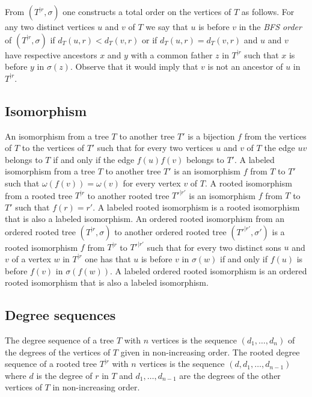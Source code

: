 \documentclass[11 pt]{modarticle}
\newcommand{\wmap}{\omega}
\newcommand{\distance}[3]{d_{#3}(#1,#2)}
\newcommand{\rtree}[2]{{#1}^{\lvert #2}}
\newcommand{\ortree}[3]{(\rtree{#1}{#2},{#3})}
\begin{document}
From $\ortree{T}{r}{\sigma}$ one constructs a total order on the vertices of $T$ as follows. For any two distinct vertices $u$ and $v$ of $T$ we say that $u$ is before $v$ in the \textit{BFS order} of $\ortree{T}{r}{\sigma}$ if $\distance{u}{r}{T} < \distance{v}{r}{T}$ or if $\distance{u}{r}{T} = \distance{v}{r}{T}$ and $u$ and $v$ have respective ancestors $x$ and $y$ with a common father $z$ in $\rtree{T}{r}$ such that $x$ is before $y$ in $\sigma(z)$. Observe that it would imply that $v$ is not an ancestor of $u$ in $\rtree{T}{r}$.


\subsection{Isomorphism}

An isomorphism from a tree $T$ to another tree $T'$ is a bijection $f$ from the vertices of $T$ to the vertices of $T'$ such that for every two vertices $u$ and $v$ of $T$ the edge $uv$ belongs to $T$ if and only if the edge $f(u)f(v)$ belongs to $T'$. A labeled isomorphism from a tree $T$ to another tree $T'$ is an isomorphism $f$ from $T$ to $T'$ such that $\wmap(f(v)) = \wmap(v)$ for every vertex $v$ of $T$. A rooted isomorphism from a rooted tree $\rtree{T}{r}$ to another rooted tree $\rtree{T'}{r'}$ is an isomorphism $f$ from $T$ to $T'$ such that $f(r) = r'$. A labeled rooted isomorphism is a rooted isomorphism that is also a labeled isomorphism. An ordered rooted isomorphism from an ordered rooted tree $\ortree{T}{r}{\sigma}$ to another ordered rooted tree $\ortree{T'}{r'}{\sigma'}$ is a rooted isomorphism $f$ from $\rtree{T}{r}$ to $\rtree{T'}{r'}$ such that for every two distinct sons $u$ and $v$ of a vertex $w$ in $\rtree{T}{r}$ one has that $u$ is before $v$ in $\sigma(w)$ if and only if $f(u)$ is before $f(v)$ in $\sigma(f(w))$. A labeled ordered rooted isomorphism is an ordered rooted isomorphism that is also a labeled isomorphism.

\subsection{Degree sequences}

The degree sequence of a tree $T$ with $n$ vertices is the sequence $(d_1, \dots, d_n)$ of the degrees of the vertices of $T$ given in non-increasing order. The rooted degree sequence of a rooted tree $\rtree{T}{r}$ with $n$ vertices is the sequence $(d, d_1, \dots, d_{n-1})$ where $d$ is the degree of $r$ in $T$ and $d_1, \dots, d_{n-1}$ are the degrees of the other vertices of $T$ in non-increasing order.
\end{document}
